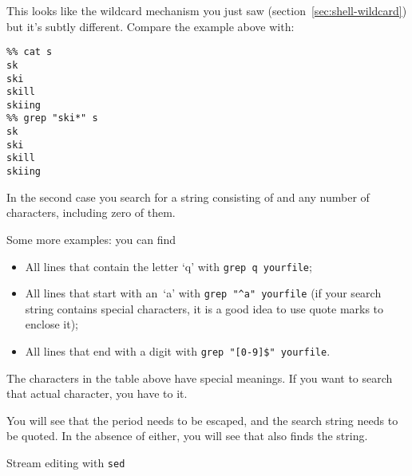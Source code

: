 This looks like the wildcard mechanism you just saw
(section~\ref{sec:shell-wildcard}) but it's subtly different. Compare
the example above with:
\begin{verbatim}
%% cat s
sk
ski
skill
skiing
%% grep "ski*" s
sk
ski
skill
skiing
\end{verbatim}
In the second case you search for a string consisting of  and
any number of  characters, including zero of them.

Some more examples: you can find
\begin{itemize}
\item All lines that contain the letter `q' with \verb+grep q yourfile+;
\item All lines that start with an~`a' with \verb+grep "^a" yourfile+
  (if your search string contains special characters, it is a good
  idea to use quote marks to enclose it);
\item All lines that end with a digit with \verb+grep "[0-9]$" yourfile+.
\end{itemize}



The characters in the table above have special meanings. If you want
to search that actual character, you have to  it.

{You will see that the period needs to be escaped, and the search
  string needs to be quoted. In the absence of either, you will see
  that  also finds the  string.}{}

 {Stream editing with \protect\texttt{sed}}

